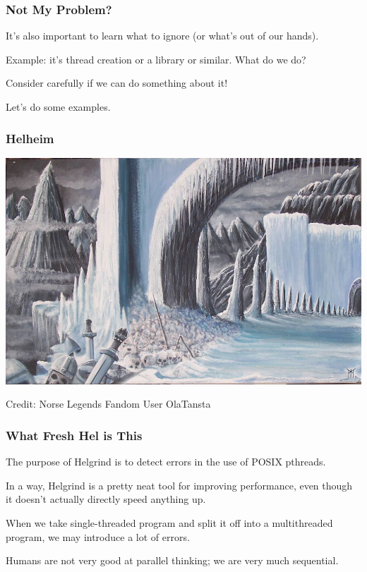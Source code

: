 \begin{frame}
\frametitle{Not My Problem?}

It's also important to learn what to ignore (or what's out of our hands). 

Example: it's thread creation or a library or similar. What do we do?

Consider carefully if we can do something about it!

Let's do some examples.

\end{frame}



\begin{frame}
	\frametitle{Helheim}

	\begin{center}
		\includegraphics[width=\textwidth]{images/helheim.jpg}
	\end{center}

	\hfill Credit: Norse Legends Fandom User OlaTansta

\end{frame}


\begin{frame}
	\frametitle{What Fresh Hel is This}

	The purpose of Helgrind is to detect errors in the use of POSIX pthreads.

	In a way, Helgrind is a pretty neat tool for improving performance, even though it doesn't actually directly speed anything up.

	When we take single-threaded program and split it off into a multithreaded program, we may introduce a lot of errors.

	Humans are not very good at parallel thinking; we are very much sequential.

\end{frame}

